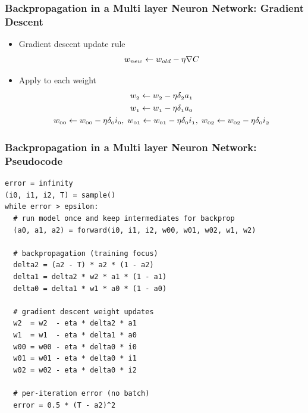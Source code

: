 \documentclass{beamer}
\newcommand{\var}[1]{\mathnormal{#1}}
\begin{document}
\begin{frame}
  \frametitle{Backpropagation in a Multi layer Neuron Network: Gradient Descent}
  \begin{itemize}
    \item Gradient descent update rule
    \begin{gather}
      \var{w_{new} \leftarrow w_{old} - \eta \nabla C}
    \end{gather}
    \item Apply to each weight
    \begin{gather}
      \var{w_2 \leftarrow w_2 - \eta \delta_2 a_1} \\
      \var{w_1 \leftarrow w_1 - \eta \delta_1 a_0} \\
      \var{w_{00} \leftarrow w_{00} - \eta \delta_0 i_0},\;
      \var{w_{01} \leftarrow w_{01} - \eta \delta_0 i_1},\;
      \var{w_{02} \leftarrow w_{02} - \eta \delta_0 i_2}
    \end{gather}
  \end{itemize}
\end{frame}
\begin{frame}[fragile]
  \frametitle{Backpropagation in a Multi layer Neuron Network: Pseudocode}
  \begin{verbatim}
error = infinity
(i0, i1, i2, T) = sample()
while error > epsilon:
  # run model once and keep intermediates for backprop
  (a0, a1, a2) = forward(i0, i1, i2, w00, w01, w02, w1, w2)

  # backpropagation (training focus)
  delta2 = (a2 - T) * a2 * (1 - a2)
  delta1 = delta2 * w2 * a1 * (1 - a1)
  delta0 = delta1 * w1 * a0 * (1 - a0)

  # gradient descent weight updates
  w2  = w2  - eta * delta2 * a1
  w1  = w1  - eta * delta1 * a0
  w00 = w00 - eta * delta0 * i0
  w01 = w01 - eta * delta0 * i1
  w02 = w02 - eta * delta0 * i2

  # per-iteration error (no batch)
  error = 0.5 * (T - a2)^2
  \end{verbatim}
\end{frame}
\end{document}
